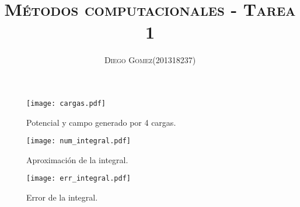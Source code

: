\documentclass{article}
\title{\textsc{\Large{Métodos computacionales - Tarea 1}}}
\author{\textsc{\Large{Diego Gomez}}\hspace{10pt}(201318237)}
\date{}
\begin{document}
    \maketitle

    \begin{figure}
        \centering
        \texttt{[image: cargas.pdf]}
        \caption{Potencial y campo generado por 4 cargas.}
        \label{fig:cargas}
    \end{figure}
    
    \begin{figure}
        \centering
        \texttt{[image: num\_integral.pdf]}
        \caption{Aproximación de la integral.}
        \label{fig:num_integral}
    \end{figure}

    \begin{figure}
        \centering
        \texttt{[image: err\_integral.pdf]}
        \caption{Error de la integral.}
        \label{fig:err_integral}
    \end{figure}    
\end{document}
